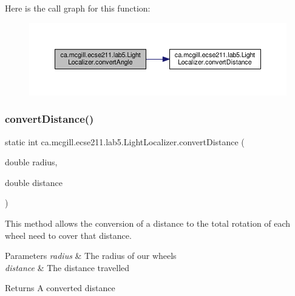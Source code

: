 Here is the call graph for this function\+:\nopagebreak
\begin{figure}[H]
\begin{center}
\leavevmode
\includegraphics[width=350pt]{classca_1_1mcgill_1_1ecse211_1_1lab5_1_1_light_localizer_ab9d7289c4badf692fd5c83635305f2c5_cgraph}
\end{center}
\end{figure}
\mbox{\label{classca_1_1mcgill_1_1ecse211_1_1lab5_1_1_light_localizer_a9eebe889aa2d4d2e881f413cc727cd9c}} 
\subsubsection{\texorpdfstring{convert\+Distance()}{convertDistance()}}
{\footnotesize\ttfamily static int ca.\+mcgill.\+ecse211.\+lab5.\+Light\+Localizer.\+convert\+Distance (\begin{DoxyParamCaption}\item[{double}]{radius,  }\item[{double}]{distance }\end{DoxyParamCaption})\hspace{0.3cm}{\ttfamily [static]}}

This method allows the conversion of a distance to the total rotation of each wheel need to cover that distance.


\begin{DoxyParams}{Parameters}
{\em radius} & The radius of our wheels \\
\hline
{\em distance} & The distance travelled \\
\hline
\end{DoxyParams}
\begin{DoxyReturn}{Returns}
A converted distance 
\end{DoxyReturn}


